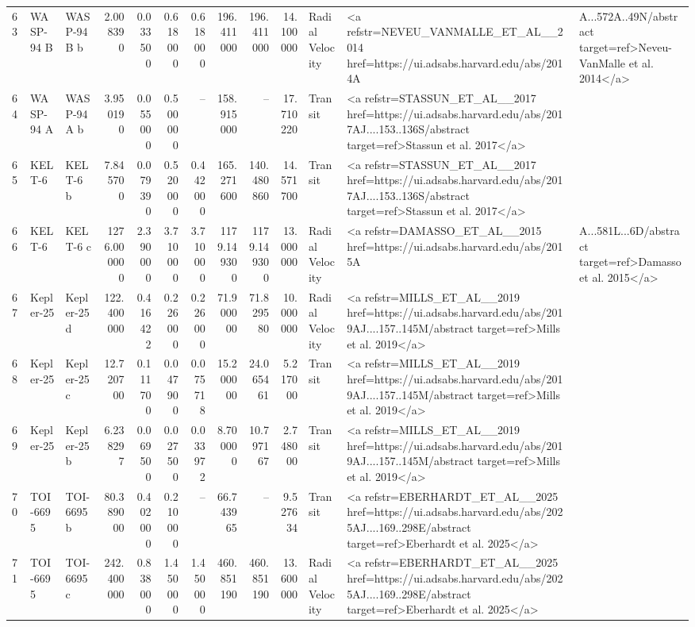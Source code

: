 \begin{tabular}{lllrrrrrrrll}
63 & WASP-94 B & WASP-94 B b & 2.008390 & 0.033500 & 0.618000 & 0.618000 & 196.411000 & 196.411000 & 14.100000 & Radial Velocity & <a refstr=NEVEU_VANMALLE_ET_AL__2014 href=https://ui.adsabs.harvard.edu/abs/2014A&A...572A..49N/abstract target=ref>Neveu-VanMalle et al. 2014</a> \\
64 & WASP-94 A & WASP-94 A b & 3.950190 & 0.055000 & 0.500000 & -- & 158.915000 & -- & 17.710220 & Transit & <a refstr=STASSUN_ET_AL__2017 href=https://ui.adsabs.harvard.edu/abs/2017AJ....153..136S/abstract target=ref>Stassun et al. 2017</a> \\
65 & KELT-6 & KELT-6 b & 7.845700 & 0.079390 & 0.520000 & 0.442000 & 165.271600 & 140.480860 & 14.571700 & Transit & <a refstr=STASSUN_ET_AL__2017 href=https://ui.adsabs.harvard.edu/abs/2017AJ....153..136S/abstract target=ref>Stassun et al. 2017</a> \\
66 & KELT-6 & KELT-6 c & 1276.000000 & 2.390000 & 3.710000 & 3.710000 & 1179.149300 & 1179.149300 & 13.000000 & Radial Velocity & <a refstr=DAMASSO_ET_AL__2015 href=https://ui.adsabs.harvard.edu/abs/2015A&A...581L...6D/abstract target=ref>Damasso et al. 2015</a> \\
67 & Kepler-25 & Kepler-25 d & 122.400000 & 0.416422 & 0.226000 & 0.226000 & 71.900000 & 71.829580 & 10.000000 & Radial Velocity & <a refstr=MILLS_ET_AL__2019 href=https://ui.adsabs.harvard.edu/abs/2019AJ....157..145M/abstract target=ref>Mills et al. 2019</a> \\
68 & Kepler-25 & Kepler-25 c & 12.720700 & 0.111700 & 0.047900 & 0.075718 & 15.200000 & 24.065461 & 5.217000 & Transit & <a refstr=MILLS_ET_AL__2019 href=https://ui.adsabs.harvard.edu/abs/2019AJ....157..145M/abstract target=ref>Mills et al. 2019</a> \\
69 & Kepler-25 & Kepler-25 b & 6.238297 & 0.069500 & 0.027500 & 0.033972 & 8.700000 & 10.797167 & 2.748000 & Transit & <a refstr=MILLS_ET_AL__2019 href=https://ui.adsabs.harvard.edu/abs/2019AJ....157..145M/abstract target=ref>Mills et al. 2019</a> \\
70 & TOI-6695 & TOI-6695 b & 80.389000 & 0.402000 & 0.210000 & -- & 66.743965 & -- & 9.527634 & Transit & <a refstr=EBERHARDT_ET_AL__2025 href=https://ui.adsabs.harvard.edu/abs/2025AJ....169..298E/abstract target=ref>Eberhardt et al. 2025</a> \\
71 & TOI-6695 & TOI-6695 c & 242.400000 & 0.838000 & 1.450000 & 1.450000 & 460.851190 & 460.851190 & 13.600000 & Radial Velocity & <a refstr=EBERHARDT_ET_AL__2025 href=https://ui.adsabs.harvard.edu/abs/2025AJ....169..298E/abstract target=ref>Eberhardt et al. 2025</a> \\

\end{tabular}
